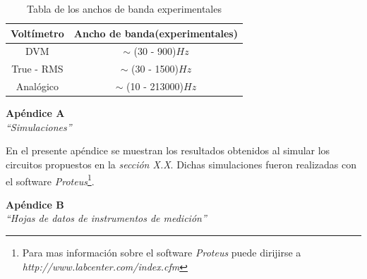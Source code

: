 \documentclass{article}
\begin{document}
\begin{table}[!hbt]
	\begin{center}
	\begin{tabular}{|c|c|}\hline
	\textbf{Voltímetro} & \textbf{Ancho de banda(experimentales)}\\ \hline
    DVM &  $\sim$ (30 - 900)$Hz$\\ \hline
    True - RMS &  $\sim$ (30 - 1500)$Hz$\\ \hline
    Analógico & $\sim$ (10 - 213000)$Hz$\\ \hline
	\end{tabular}
	\caption{Tabla de los anchos de banda experimentales}
	\end{center}
\end{table}




\newpage
\vspace*{4cm}
\begin{center}
	\textbf{\Huge{Apéndice A}} \\
	\bigskip\bigskip
	\Large{\textit{``Simulaciones''}}
\end{center}


\newpage \textit{}
\newpage

	En el presente apéndice se muestran los resultados obtenidos al simular los circuitos propuestos en la \textit{sección X.X}. Dichas simulaciones fueron realizadas con el software \textit{Proteus}\footnote{Para mas información sobre el software \textit{Proteus} puede dirijirse a \textit{http://www.labcenter.com/index.cfm}}.
\bigskip \bigskip





\newpage
\vspace*{4cm}
\begin{center}
	\textbf{\Huge{Apéndice B}} \\
	\bigskip\bigskip
	\Large{\textit{``Hojas de datos de instrumentos de medición''}}
\end{center}
\end{document}
